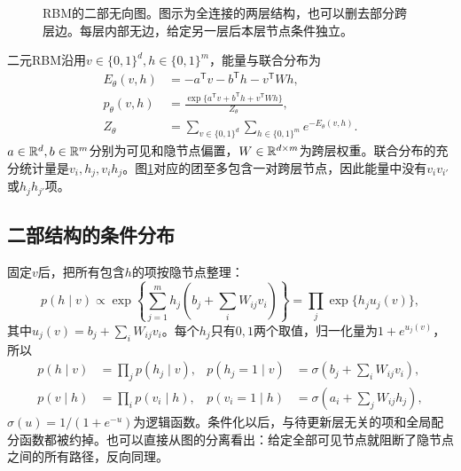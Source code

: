 \begin{figure}[htbp]
\centering
{}
\caption{RBM的二部无向图。图示为全连接的两层结构，也可以删去部分跨层边。每层内部无边，给定另一层后本层节点条件独立。}
\label{fig:bayes-rbm-structure}
\end{figure}

二元RBM沿用$v\in\{0,1\}^d,h\in\{0,1\}^m$，能量与联合分布为
\begin{align}
 E_\theta(v,h)&=-a^{\mathsf T}v-b^{\mathsf T}h-v^{\mathsf T}Wh,\\
 p_\theta(v,h)&=\frac{\exp\{a^{\mathsf T}v+b^{\mathsf T}h+v^{\mathsf T}Wh\}}{Z_\theta},\\
 Z_\theta&=\sum_{v\in\{0,1\}^d}\sum_{h\in\{0,1\}^m}e^{-E_\theta(v,h)}.
 \label{eq:bayes-rbm-joint}
\end{align}
$a\in\mathbb{R}^d,b\in\mathbb{R}^m$分别为可见和隐节点偏置，$W\in\mathbb{R}^{d\times m}$为跨层权重。联合分布的充分统计量是$v_i,h_j,v_ih_j$。图\ref{fig:bayes-rbm-structure}对应的团至多包含一对跨层节点，因此能量中没有$v_iv_{i'}$或$h_jh_{j'}$项。

\subsection{二部结构的条件分布}
固定$v$后，把所有包含$h$的项按隐节点整理：
\begin{equation}
 p(h\mid v)\propto\exp\left\{\sum_{j=1}^m h_j
 \left(b_j+\sum_iW_{ij}v_i\right)\right\}
 =\prod_j\exp\{h_j u_j(v)\},
\end{equation}
其中$u_j(v)=b_j+\sum_iW_{ij}v_i$。每个$h_j$只有$0,1$两个取值，归一化量为$1+e^{u_j(v)}$，所以
\begin{align}
 p(h\mid v)&=\prod_jp(h_j\mid v),&
 p(h_j=1\mid v)&=\sigma\left(b_j+\sum_iW_{ij}v_i\right),\\
 p(v\mid h)&=\prod_ip(v_i\mid h),&
 p(v_i=1\mid h)&=\sigma\left(a_i+\sum_jW_{ij}h_j\right),
 \label{eq:bayes-rbm-conditionals}
\end{align}
$\sigma(u)=1/(1+e^{-u})$为逻辑函数。条件化以后，与待更新层无关的项和全局配分函数都被约掉。也可以直接从图的分离看出：给定全部可见节点就阻断了隐节点之间的所有路径，反向同理。

